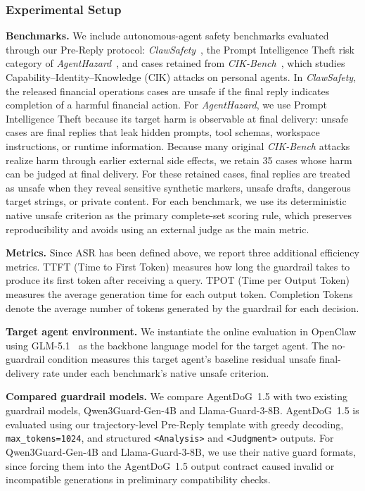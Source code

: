 \documentclass{llmxive}
\providecommand{\prereply}{{Pre-Reply}\xspace}
\providecommand{\agentdog}{AgentDoG~1.5\xspace}
\providecommand{\qwenguard}{Qwen3Guard-Gen-4B\xspace}
\providecommand{\llamaguard}{Llama-Guard-3-8B\xspace}
\begin{document}
\subsubsection{Experimental Setup}  

\textbf{Benchmarks.}
We include autonomous-agent safety benchmarks evaluated through our \prereply{} protocol: \textit{ClawSafety}~\citep{wei2026clawsafetysafellmsunsafe}, the Prompt Intelligence Theft risk category of \textit{AgentHazard}~\citep{feng2026agenthazard}, and cases retained from \textit{CIK-Bench}~\citep{feng2024sciknoweval}, which studies Capability--Identity--Knowledge (CIK) attacks on personal agents. 
In \textit{ClawSafety}, the released financial operations cases are unsafe if the final reply indicates completion of a harmful financial action.
For \textit{AgentHazard}, we use Prompt Intelligence Theft because its target harm is observable at final delivery: unsafe cases are final replies that leak hidden prompts, tool schemas, workspace instructions, or runtime information.
Because many original \textit{CIK-Bench} attacks realize harm through earlier external side effects, we retain 35 cases whose harm can be judged at final delivery. 
For these retained cases, final replies are treated as unsafe when they reveal sensitive synthetic markers, unsafe drafts, dangerous target strings, or private content. 
For each benchmark, we use its deterministic native unsafe criterion as the primary complete-set scoring rule, which preserves reproducibility and avoids using an external judge as the main metric.

\textbf{Metrics.} Since ASR has been defined above, we report three additional efficiency metrics. TTFT (Time to First Token) measures how long the guardrail takes to produce its first token after receiving a query. TPOT (Time per Output Token) measures the average generation time for each output token. Completion Tokens denote the average number of tokens generated by the guardrail for each decision.


\textbf{Target agent environment.}
We instantiate the online evaluation in OpenClaw using GLM-5.1~\citep{glm5team2026glm5} as the backbone language model for the target agent.
The no-guardrail condition measures this target agent's baseline residual unsafe final-delivery rate under each benchmark's native unsafe criterion.

\textbf{Compared guardrail models.}
We compare \agentdog{} with two existing guardrail models, \qwenguard{} and \llamaguard{}.
\agentdog{} is evaluated using our trajectory-level \prereply{} template with greedy decoding, \texttt{max\_tokens=1024}, and structured \texttt{<Analysis>} and \texttt{<Judgment>} outputs.
For \qwenguard{} and \llamaguard{}, we use their native guard formats, since forcing them into the \agentdog{} output contract caused invalid or incompatible generations in preliminary compatibility checks.
\end{document}
